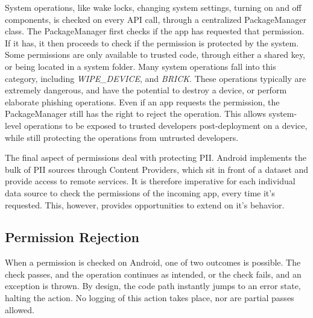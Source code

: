 System operations, like wake locks, changing system settings, turning on and off components, is checked on every API call, through a centralized PackageManager class. The PackageManager first checks if the app has requested that permission. If it has, it then proceeds to check if the permission is protected by the system. Some permissions are only available to trusted code, through either a shared key, or being located in a system folder. Many system operations fall into this category, including \textit{WIPE\_DEVICE}, and \textit{BRICK}. These operations typically are extremely dangerous, and have the potential to destroy a device, or perform elaborate phishing operations. Even if an app requests the permission, the PackageManager still has the right to reject the operation. This allows system-level operations to be exposed to trusted developers post-deployment on a device, while still protecting the operations from untrusted developers.

The final aspect of permissions deal with protecting PII. Android implements the bulk of PII sources through Content Providers, which sit in front of a dataset and provide access to remote services. It is therefore imperative for each individual data source to check the permissions of the incoming app, every time it's requested. This, however, provides opportunities to extend on it's behavior.

\subsection{Permission Rejection}
\label{sec:permissionrejection}
When a permission is checked on Android, one of two outcomes is possible. The check passes, and the operation continues as intended, or the check fails, and an exception is thrown. By design, the code path instantly jumps to an error state, halting the action. No logging of this action takes place, nor are partial passes allowed.

